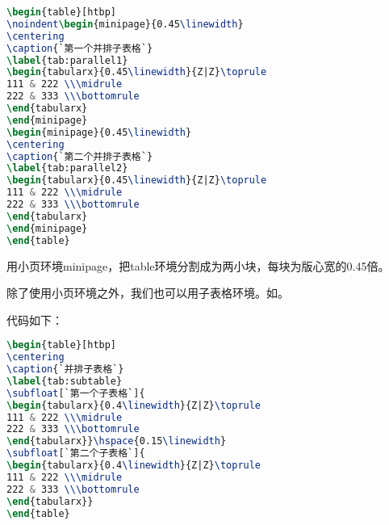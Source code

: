 \begin{lstlisting}[language=TeX]
\begin{table}[htbp]
\noindent\begin{minipage}{0.45\linewidth}
\centering
\caption{`第一个并排子表格`}
\label{tab:parallel1}
\begin{tabularx}{0.45\linewidth}{Z|Z}\toprule
111 & 222 \\\midrule
222 & 333 \\\bottomrule
\end{tabularx}
\end{minipage}
\begin{minipage}{0.45\linewidth}
\centering
\caption{`第二个并排子表格`}
\label{tab:parallel2}
\begin{tabularx}{0.45\linewidth}{Z|Z}\toprule
111 & 222 \\\midrule
222 & 333 \\\bottomrule
\end{tabularx}
\end{minipage}
\end{table}
\end{lstlisting}

用小页环境minipage，把table环境分割成为两小块，每块为版心宽的0.45倍。

除了使用小页环境之外，我们也可以用子表格环境。如。

\begin{table}[htbp]
\centering
\caption{并排子表格}
\label{tab:subtable}
\hspace{0.15\linewidth}
\end{table}

代码如下：

\begin{lstlisting}[language=TeX]
\begin{table}[htbp]
\centering
\caption{`并排子表格`}
\label{tab:subtable}
\subfloat[`第一个子表格`]{
\begin{tabularx}{0.4\linewidth}{Z|Z}\toprule
111 & 222 \\\midrule
222 & 333 \\\bottomrule
\end{tabularx}}\hspace{0.15\linewidth}
\subfloat[`第二个子表格`]{
\begin{tabularx}{0.4\linewidth}{Z|Z}\toprule
111 & 222 \\\midrule
222 & 333 \\\bottomrule
\end{tabularx}}
\end{table}
\end{lstlisting}

